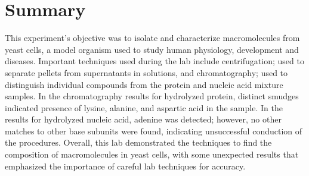 \section*{Summary}
This experiment's objective was to isolate and characterize macromolecules from yeast cells, a model organism used to study human physiology, development and diseases.
Important techniques used during the lab include centrifugation; used to separate pellets from supernatants in solutions, and chromatography; used to distinguish individual compounds from the protein and nucleic acid mixture samples.
In the chromatography results for hydrolyzed protein, distinct smudges indicated presence of lysine, alanine, and aspartic acid in the sample. 
In the results for hydrolyzed nucleic acid, adenine was detected; however, no other matches to other base subunits were found, indicating unsuccessful conduction of the procedures.
Overall, this lab demonstrated the techniques to find the composition of macromolecules in yeast cells, with some unexpected results that emphasized the importance of careful lab techniques for accuracy.